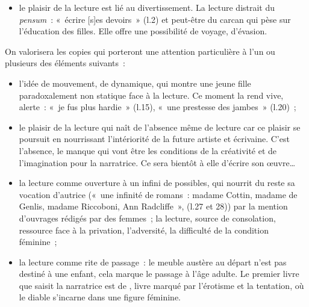 {\begin{itemize}
\item le plaisir de la lecture est lié au divertissement. La lecture distrait du \emph{pensum}~:
«~écrire [s]es devoirs~» (l.2) et peut-être du carcan qui pèse sur l'éducation des filles.
Elle offre une possibilité de voyage, d'évasion.
\end{itemize}

On valorisera les copies qui porteront une attention particulière à l'un ou plusieurs des
éléments suivants~:

\begin{itemize}
\item l'idée de mouvement, de dynamique, qui montre une jeune fille paradoxalement non
statique face à la lecture. Ce moment la rend vive, alerte~: «~je fus plus hardie~» (l.15),
«~une prestesse des jambes~» (l.20)~;

\item le plaisir de la lecture qui naît de l'absence même de lecture car ce plaisir se poursuit
en nourrissant l'intériorité de la future artiste et écrivaine. C'est l'absence, le manque
qui vont être les conditions de la créativité et de l'imagination pour la narratrice. Ce
sera bientôt à elle d'écrire son œuvre…

\item la lecture comme ouverture à un infini de possibles, qui nourrit du reste sa vocation
d'autrice («~une infinité de romans~: madame Cottin, madame de Genlis, madame
Riccoboni, Ann Radcliffe~», (l.27 et 28)) par la mention d'ouvrages rédigés par des
femmes~; la lecture, source de consolation, ressource face à la privation, l'adversité,
la difficulté de la condition féminine~;

\item la lecture comme rite de passage~: le meuble austère au départ n'est pas destiné à
une enfant, cela marque le passage à l'âge adulte. Le premier livre que saisit la
narratrice est  de , livre marqué par l'érotisme et la
tentation, où le diable s'incarne dans une figure féminine.
\end{itemize}}%

